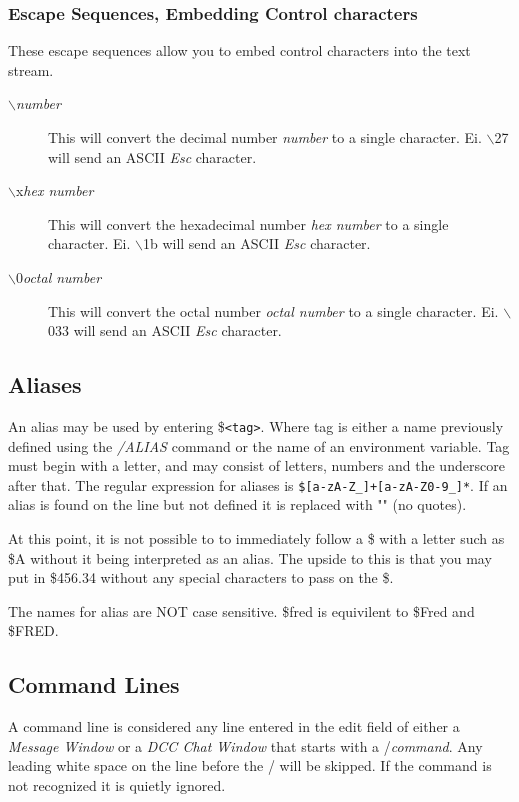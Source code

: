 \documentclass[titlepage]{article}
\begin{document}
\subsubsection{Escape Sequences, Embedding Control characters}
These escape sequences allow you to embed control characters into the 
text stream.
\begin{description}
\item[$\backslash$\textit{number}] This will convert the decimal
number \textit{number} to a single character. Ei. $\backslash$27 will
send an ASCII \textit{Esc} character.
\item[$\backslash$x\textit{hex number}] This will convert the hexadecimal
number \textit{hex number} to a single character. Ei. $\backslash$1b will
send an ASCII \textit{Esc} character.
\item[$\backslash$0\textit{octal number}] This will convert the octal
number \textit{octal number} to a single character. Ei. $\backslash$033 will
send an ASCII \textit{Esc} character.
\end{description}

\subsection{Aliases}
An alias may be used by entering \$\texttt{<tag>}. Where tag is either
a name previously defined using the \textit{/ALIAS} command or the
name of an environment variable. Tag must begin with a letter, and may
consist of letters, numbers and the underscore after that. The regular
expression for aliases is \texttt{\$[a-zA-Z\_]+[a-zA-Z0-9\_]*}. If an
alias is found on the line but not defined it is replaced with
"" (no quotes).

At this point, it is not possible to to immediately follow a \$ with a
letter such as \$A without it being interpreted as an alias. The
upside to this is that you may put in \$456.34 without any special
characters to pass on the \$.

The names for alias are NOT case sensitive. \$fred is equivilent to
\$Fred and \$FRED.

\subsection{Command Lines}
A command line is considered any line entered in the edit field of
either a \textit{Message Window} or a \textit{DCC Chat Window} that
starts with a /\textit{command}. Any leading white space on the line
before the / will be skipped. If the command is not recognized it is
quietly ignored.
\end{document}
